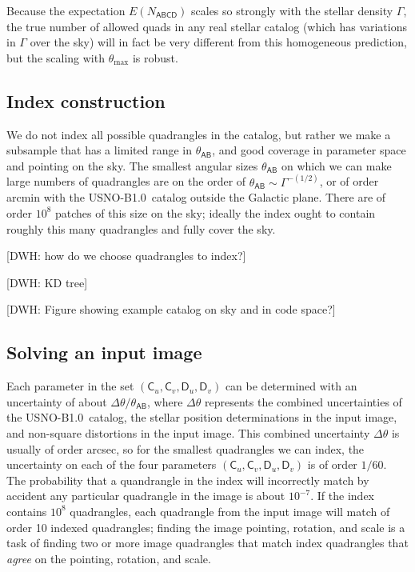 \documentclass[12pt,preprint]{aastex}
\newcommand{\usnob}{USNO-B1.0}
\newcommand{\starlabel}[1]{\mathsf{#1}}
\newcommand{\AAA}{\starlabel{A}}
\newcommand{\BBB}{\starlabel{B}}
\newcommand{\CCC}{\starlabel{C}}
\newcommand{\DDD}{\starlabel{D}}
\newcommand{\NABCD}{N_{\AAA\BBB\CCC\DDD}}
\newcommand{\ENABCD}{E(\NABCD)}
\newcommand{\thetaAB}{\theta_{\AAA\BBB}}
\newcommand{\thetamax}{\theta_\mathrm{max}}
\begin{document}
Because the expectation $\ENABCD$ scales so strongly with the stellar
density $\Gamma$, the true number of allowed quads in any real stellar
catalog (which has variations in $\Gamma$ over the sky) will in fact
be very different from this homogeneous prediction, but the scaling
with $\thetamax$ is robust.

\subsection{Index construction}

We do not index all possible quadrangles in the catalog, but rather we
make a subsample that has a limited range in $\thetaAB$, and good
coverage in parameter space and pointing on the sky.  The smallest
angular sizes $\thetaAB$ on which we can make large numbers of
quadrangles are on the order of $\thetaAB\sim\Gamma^{-(1/2)}$, or of
order arcmin with the \usnob\ catalog outside the Galactic plane.
There are of order $10^8$ patches of this size on the sky; ideally the
index ought to contain roughly this many quadrangles and fully cover
the sky.

[DWH: how do we choose quadrangles to index?]

[DWH: KD tree]

[DWH: Figure showing example catalog on sky and in code space?]

\subsection{Solving an input image}

Each parameter in the set $(\CCC_u,\CCC_v,\DDD_u,\DDD_v)$ can be
determined with an uncertainty of about $\Delta\theta/\thetaAB$, where
$\Delta\theta$ represents the combined uncertainties of the \usnob\
catalog, the stellar position determinations in the input image, and
non-square distortions in the input image.  This combined uncertainty
$\Delta\theta$ is usually of order arcsec, so for the smallest
quadrangles we can index, the uncertainty on each of the four
parameters $(\CCC_u,\CCC_v,\DDD_u,\DDD_v)$ is of order $1/60$.  The
probability that a quandrangle in the index will incorrectly match by
accident any particular quadrangle in the image is about $10^{-7}$.
If the index contains $10^8$ quadrangles, each quadrangle from the
input image will match of order 10 indexed quadrangles; finding the
image pointing, rotation, and scale is a task of finding two or more
image quadrangles that match index quadrangles that \emph{agree} on
the pointing, rotation, and scale.
\end{document}
